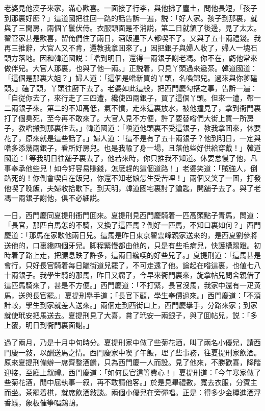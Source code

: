 老婆見他漢子來家，滿心歡喜。一面接了行李，與他拂了塵土，問他長短，「孩子到那裏好麽？」這道國把往回一路的話告訴一遍，説：「好人家。孩子到那裏，就與了三間房，兩個丫鬟伏侍。衣服頭面是不消説，第二日就領了後邊，見了太太。翟管家甚是歡喜，留俺們住了兩日，酒飯連下人都喫不了。又與了五十兩禮錢。我再三推辭，大官人又不肯，還教我拿囬來了。」因把銀子與婦人收了，婦人一塊石頭方落地。因和韓道國説：「喒到明日，還得一兩銀子謝老馮。你不在，虧他常來做伴兒。大官人那裏，也與了他一兩。」正説着，只見丫頭過來遞茶。韓道國道：「這個是那裏大姐？」婦人道：「這個是喒新買的丫頭，名喚錦兒。過來與你爹磕頭。」磕了頭，丫頭往廚下去了。老婆如此這般，把西門慶勾搭之事，告訴一遍：「自従你去了，來行走了三四遭，纔使四兩銀子，買了這個丫頭。但來一遭，帶一二兩銀子來。第二的不知高低，氣不憤，走來這裏放水，被他撞見了，拿到衙門裏打了個臭死，至今再不敢來了。大官人見不方便，許了要替喒們大街上買一所房子，教喒搬到那裏住去。」韓道國道：「嗔道他頭裏不受這銀子，教我拿囬來，休要花了，原來就是這些話了。」婦人道：「這不是有了五十兩銀子？他到明日，一定與喒多添幾兩銀子，看所好房兒。也是我輸了身一場，且落他些好供給穿戴！」韓道國道：「等我明日往舖子裏去了，他若來時，你只推我不知道。休要怠慢了他，凡事奉承他些兒！如今好容易賺錢，怎麽趕的這個道路！」老婆笑道：「賊強人，倒路死的！你倒會喫自在飯兒，你還不知老娘怎生受苦哩！」兩個又笑了一囬，打發他喫了晚飯，夫婦收拾歇下。到天明，韓道國宅裏討了鑰匙，開舖子去了。與了老馮一兩銀子謝他，俱不必細説。

一日，西門慶同夏提刑衙門囬來。夏提刑見西門慶騎着一匹高頭點子青馬，問道：「長官，那匹白馬怎的不騎，又換了這匹馬？倒好一匹馬，不知口裏如何？」西門慶道：「那馬在家歇他兩日兒。這馬是昨日東京翟雲峰親家送來的，是西夏劉參將送他的，口裏纔四個牙兒。脚程緊慢都由他的，只是有些毛病兒，快護槽踢蹬。初時着了路上走，把膘息跌了許多，這兩日纔喫的好些兒了。」夏提刑道：「這馬甚是會行，只好長官騎着每日躧街道兒罷了，不可走遠了他。論起在喒這裏，也値七八十兩銀子。我學生騎的那馬，昨日又瘸了，今早來衙門裏來，旋拿帖兒問舍親借了這匹馬騎來了，甚是不方便。」西門慶道：「不打緊，長官沒馬，我家中還有一疋黄馬，送與長官罷。」夏提刑擧手道；「長官下顧，學生奉價過來。」西門慶道：「不湏計較，學生到家就差人送來。」兩個走到西街口上，西門慶擧手，分路來家；到家就使玳安把馬送去。夏提刑見了大喜，賞了玳安一兩銀子，與了囬帖兒，説：「多上覆，明日到衙門裏面謝。」

過了兩月，乃是十月中旬時分。夏提刑家中做了些菊花酒，叫了兩名小優兒，請西門慶一敍，以酬送馬之情。西門慶家中喫了午飯，理了些事務，往夏提刑家飲酒。原來夏提刑備辦一席齊整酒餚，只為西門慶一人而設。見了他來，不勝歡喜，降階迎接，至廳上叙禮。西門慶道：「如何長官這等費心！」夏提刑道：「今年寒家做了些菊花酒，閒中屈執事一叙，再不敢請他客。」於是見畢禮數，寬去衣服，分賓主而坐。茶罷着棋，就席飲酒敍談。兩個小優兒在旁彈唱。正是：得多少金樽進酒浮香蟻，象板催箏唱鷓鴣。


